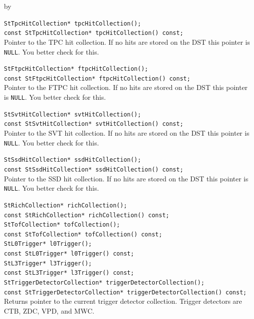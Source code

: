 \documentclass[twoside]{article}
\newcommand{\entrylabel}[1]{\mbox{\textbf{{#1}}}\hfil}%
\newenvironment{entry}
{\begin{list}{}%
    {\renewcommand{\makelabel}{\entrylabel}%
     \setlength{\labelwidth}{90pt}%
     \setlength{\leftmargin}{\labelwidth}
     \advance\leftmargin by \labelsep%
      }%
    }%
  {\end{list}}
\newcommand{\Entrylabel}[1]%
{\raisebox{0pt}[1ex][0pt]{\makebox[\labelwidth][l]%
    {\parbox[t]{\labelwidth}{\hspace{0pt}\textbf{{#1}}}}}}
\newenvironment{Entry}%
{\renewcommand{\entrylabel}{\Entrylabel}\begin{entry}}%
  {\end{entry}}
\begin{document}
\begin{Entry}
    \verb+StTpcHitCollection* tpcHitCollection();+\\
    \verb+const StTpcHitCollection* tpcHitCollection() const;+\\
    Pointer to the TPC hit collection. If no hits are stored on the
    DST this pointer is \texttt{NULL}. You better check for this.
    
    \verb+StFtpcHitCollection* ftpcHitCollection();+\\
    \verb+const StFtpcHitCollection* ftpcHitCollection() const;+\\
    Pointer to the FTPC hit collection. If no hits are stored on the
    DST this pointer is \texttt{NULL}. You better check for this.

    \verb+StSvtHitCollection* svtHitCollection();+\\
    \verb+const StSvtHitCollection* svtHitCollection() const;+\\
    Pointer to the SVT hit collection. If no hits are stored on the
    DST this pointer is \texttt{NULL}. You better check for this.    

    \verb+StSsdHitCollection* ssdHitCollection();+\\
    \verb+const StSsdHitCollection* ssdHitCollection() const;+\\
    Pointer to the SSD hit collection. If no hits are stored on the
    DST this pointer is \texttt{NULL}. You better check for this.   

    \verb+StRichCollection* richCollection();+\\
    \verb+const StRichCollection* richCollection() const;+\\

    \verb+StTofCollection* tofCollection();+\\
    \verb+const StTofCollection* tofCollection() const;+\\

    \verb+StL0Trigger* l0Trigger();+\\
    \verb+const StL0Trigger* l0Trigger() const;+\\

    \verb+StL3Trigger* l3Trigger();+\\
    \verb+const StL3Trigger* l3Trigger() const;+\\

    \verb+StTriggerDetectorCollection* triggerDetectorCollection();+\\
    \verb+const StTriggerDetectorCollection* triggerDetectorCollection() const;+\\
    Returns pointer to the current trigger detector collection.
    Trigger detectors are CTB, ZDC, VPD, and MWC.
    

\end{Entry}
\end{document}
